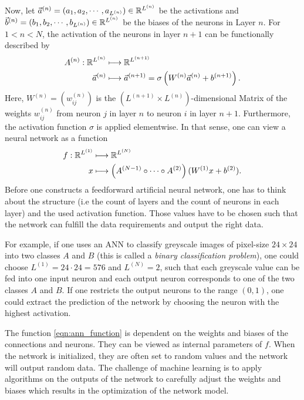 Now, let $\vec{a}^{(n)} = (a_1, a_2, \dotsb, a_{L^{(n)}}) \in \mathbb{R}^{L^{(n)}}$ be the activations and $\vec{b}^{(n)} = (b_1, b_2, \dotsb, b_{L^{(n)}}) \in \mathbb{R}^{L^{(n)}}$ be the biases of the neurons in Layer $n$. For $1< n < N$, the activation of the neurons in layer $n+1$ can be functionally described by
\begin{align}
  A^{(n)}: \mathbb{R}^{L^{(n)}} & \longmapsto \mathbb{R}^{L^{(n+1)}}                                                        \\
  \vec{a}^{(n)}         & \longmapsto \vec{a}^{(n+1)} = \sigma\left(W^{(n)}\vec{a}^{(n)} +b^{(n+1)}\right).
\end{align}
Here, $W^{(n)} = (w^{(n)}_{ij})$ is the $(L^{(n+1)} \times L^{(n)})$-dimensional Matrix of the weights $w^{(n)}_{ij}$ from neuron $j$ in layer $n$ to neuron $i$ in layer $n+1$. Furthermore, the activation function $\sigma$ is applied elementwise. In that sense, one can view a neural network as a function
\begin{align}
  \label{eqn:ann_function}
  f: \mathbb{R}^{L^{(1)}} & \longmapsto \mathbb{R}^{L^{(N)}}                                                           \\
  x               & \longmapsto \left(A^{(N-1)} \circ \dotsb \circ A^{(2)}\right)(W^{(1)}x + b^{(2)}).
\end{align}
Before one constructs a feedforward artificial neural network, one has to think about the structure (i.e the count of layers and the count of neurons in each layer) and the used activation function. Those values have to be chosen such that the network can fulfill the data requirements and output the right data.

For example, if one uses an ANN to classify greyscale images of pixel-size $24\times 24$ into two classes $A$ and $B$ (this is called a \textit{binary classification problem}), one could choose $L^{(1)} = 24 \cdot 24 = 576$ and $L^{(N)} = 2$, such that each greyscale value can be fed into one input neuron and each output neuron corresponds to one of the two classes $A$ and $B$. If one restricts the output neurons to the range $(0, 1)$, one could extract the prediction of the network by choosing the neuron with the highest activation.

The function \eqref{eqn:ann_function} is dependent on the weights and biases of the connections and neurons. They can be viewed as internal parameters of $f$. When the network is initialized, they are often set to random values and the network will output random data. The challenge of machine learning is to apply algorithms on the outputs of the network to carefully adjust the weights and biases which results in the optimization of the network model.

